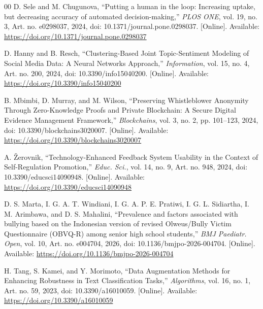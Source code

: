 \documentclass[conference]{IEEEtran}
\begin{document}
\begin{thebibliography}{00}
D. Sele and M. Chugunova, ``Putting a human in the loop: Increasing uptake, but decreasing accuracy of automated decision-making,'' \textit{PLOS ONE}, vol. 19, no. 3, Art. no. e0298037, 2024, doi: 10.1371/journal.pone.0298037. [Online]. Available: \url{https://doi.org/10.1371/journal.pone.0298037}

D. Hanny and B. Resch, ``Clustering-Based Joint Topic-Sentiment Modeling of Social Media Data: A Neural Networks Approach,'' \textit{Information}, vol. 15, no. 4, Art. no. 200, 2024, doi: 10.3390/info15040200. [Online]. Available: \url{https://doi.org/10.3390/info15040200}

B. Mbimbi, D. Murray, and M. Wilson, ``Preserving Whistleblower Anonymity Through Zero-Knowledge Proofs and Private Blockchain: A Secure Digital Evidence Management Framework,'' \textit{Blockchains}, vol. 3, no. 2, pp. 101--123, 2024, doi: 10.3390/blockchains3020007. [Online]. Available: \url{https://doi.org/10.3390/blockchains3020007}

A. \v{Z}erovnik, ``Technology-Enhanced Feedback System Usability in the Context of Self-Regulation Promotion,'' \textit{Educ. Sci.}, vol. 14, no. 9, Art. no. 948, 2024, doi: 10.3390/educsci14090948. [Online]. Available: \url{https://doi.org/10.3390/educsci14090948}

D. S. Marta, I. G. A. T. Windiani, I. G. A. P. E. Pratiwi, I. G. L. Sidiartha, I. M. Arimbawa, and D. S. Mahalini, ``Prevalence and factors associated with bullying based on the Indonesian version of revised Olweus/Bully Victim Questionnaire (OBVQ-R) among senior high school students,'' \textit{BMJ Paediatr. Open}, vol. 10, Art. no. e004704, 2026, doi: 10.1136/bmjpo-2026-004704. [Online]. Available: \url{https://doi.org/10.1136/bmjpo-2026-004704}

H. Tang, S. Kamei, and Y. Morimoto, ``Data Augmentation Methods for Enhancing Robustness in Text Classification Tasks,'' \textit{Algorithms}, vol. 16, no. 1, Art. no. 59, 2023, doi: 10.3390/a16010059. [Online]. Available: \url{https://doi.org/10.3390/a16010059}
\end{thebibliography}
\end{document}
